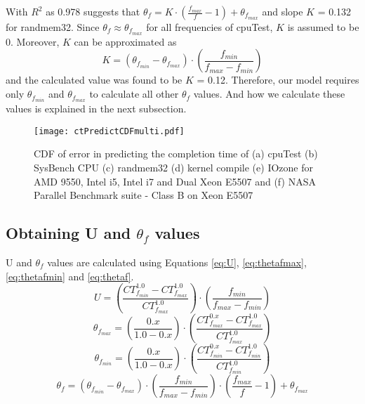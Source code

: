 \documentclass{sig-alternate}
\begin{document}
With $R^2$ as 0.978 suggests that $\theta_{f} = K\cdot( \frac{f_{max}}{f} - 1 ) + \theta_{f_{max}}$ and slope $K$ = 0.132 for randmem32. Since $\theta_{f} \approx \theta_{f_{max}}$ for all frequencies of cpuTest, $K$ is assumed to be 0. Moreover, $K$ can be approximated as $$K = (\theta_{f_{min}} - \theta_{f_{max}}) \cdot (\frac{f_{min}}{f_{max} - f_{min}})$$ and the calculated value was found to be $K$ = 0.12. Therefore, our model requires only $\theta_{f_{min}}$ and $\theta_{f_{max}}$ to calculate all other $\theta_f$ values. And how we calculate these values is explained in the next subsection. 



\begin{figure*}
\centering
\texttt{[image: ctPredictCDFmulti.pdf]}
\caption{CDF of error in predicting the completion time of (a) cpuTest (b) SysBench CPU (c) randmem32 (d) kernel compile (e) IOzone for AMD 9550, Intel i5, Intel i7 and Dual Xeon E5507 and (f) NASA Parallel Benchmark suite - Class B on Xeon E5507}
\label{fig:ctPredictCDFmulti}
\vspace{-0.5cm}
\end{figure*}



\subsection{Obtaining U and $\theta_f$ values}
U and $\theta_f$ values are calculated using Equations \ref{eq:U}, \ref{eq:thetafmax}, \ref{eq:thetafmin} and \ref{eq:thetaf}. 
\begin{equation}
\label{eq:U}
U = ( \frac{CT^{1.0}_{f_{min}} - CT^{1.0}_{f_{max}}}{CT^{1.0}_{f_{max}}} ) \cdot ( \frac{f_{min}}{f_{max}-f_{min}} )
\end{equation}
\begin{equation}
\label{eq:thetafmax}
 \theta_{f_{max}} = (\frac{0.x}{1.0 - 0.x}) \cdot (\frac{CT^{0.x}_{f_{max}} - CT^{1.0}_{f_{max}}}{CT^{1.0}_{f_{max}}})
\end{equation}
\begin{equation}
\label{eq:thetafmin}
 \theta_{f_{min}} = (\frac{0.x}{1.0 - 0.x}) \cdot (\frac{CT^{0.x}_{f_{min}} - CT^{1.0}_{f_{min}}}{CT^{1.0}_{f_{min}}})
\end{equation}
\begin{equation}
\label{eq:thetaf}
\theta_{f} =  (\theta_{f_{min}} - \theta_{f_{max}}) \cdot (\frac{f_{min}}{f_{max} - f_{min}}) \cdot( \frac{f_{max}}{f} - 1 ) + \theta_{f_{max}}
\end{equation}
\end{document}
